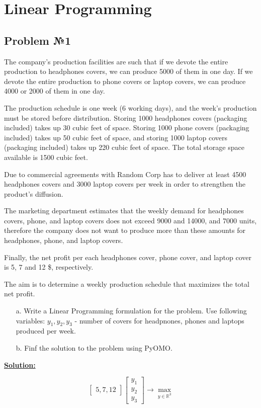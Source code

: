 \section{Linear Programming}

\subsection{Problem №1}
The company’s production facilities are such that if we devote the entire production to headphones covers, we can produce 5000 of them in one day. If we devote the entire production to phone covers or laptop covers, we can produce 4000 or 2000 of them in one day.

The production schedule is one week (6 working days), and the week’s production must be stored before distribution. Storing 1000 headphones covers (packaging included) takes up 30 cubic feet of space. Storing 1000 phone covers (packaging included) takes up 50 cubic feet of space, and storing 1000 laptop covers (packaging included) takes up 220 cubic feet of space. The total storage space available is 1500 cubic feet.

Due to commercial agreements with Random Corp has to deliver at least 4500 headphones covers and 3000 laptop covers per week in order to strengthen the product’s diffusion.

The marketing department estimates that the weekly demand for headphones covers, phone, and laptop covers does not exceed 9000 and 14000, and 7000 units, therefore the company does not want to produce more than these amounts for headphones, phone, and laptop covers.

Finally, the net profit per each headphones cover, phone cover, and laptop cover is 5, 7 and 12 \$, respectively.

The aim is to determine a weekly production schedule that maximizes the total net profit.

\begin{enumerate}
    \item[a.]  Write a Linear Programming formulation for the problem. Use following variables:
    $y_1, y_2, y_3$ - number of covers for headpnones, phones and laptops produced per week.
    \item[b.] Finf the solution to the problem using PyOMO.
\end{enumerate}

\underline{\textbf{Solution:}}


\begin{equation*}
    \begin{bmatrix} 5, 7, 12 \end{bmatrix} 
    \begin{bmatrix}
    y_1 \\
    y_2 \\
    y_3
    \end{bmatrix}  \rightarrow \max_{y \in \mathds{R}^3}
\end{equation*}

